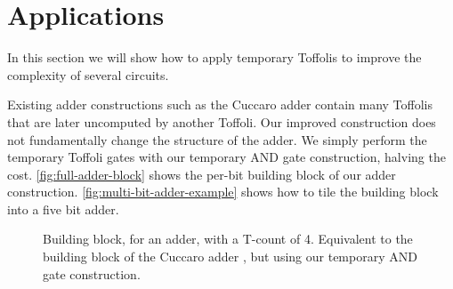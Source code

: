 \documentclass[twocolumn,longbibliography]{quantumarticle-customized}
\begin{document}
\section{Applications}
\label{sec:circuit-constructions}

In this section we will show how to apply temporary Toffolis to improve the complexity of several circuits.

Existing adder constructions such as the Cuccaro adder \cite{Cuccaro2004} contain many Toffolis that are later uncomputed by another Toffoli.
Our improved construction does not fundamentally change the structure of the adder.
We simply perform the temporary Toffoli gates with our temporary AND gate construction, halving the cost.
\autoref{fig:full-adder-block} shows the per-bit building block of our adder construction.
\autoref{fig:multi-bit-adder-example} shows how to tile the building block into a five bit adder.

\begin{figure}
  \caption{
	Building block, for an adder, with a T-count of 4.
	Equivalent to the building block of the Cuccaro adder \cite{Cuccaro2004}, but using our temporary AND gate construction.
  }
  \label{fig:full-adder-block}
\end{figure}
\end{document}
